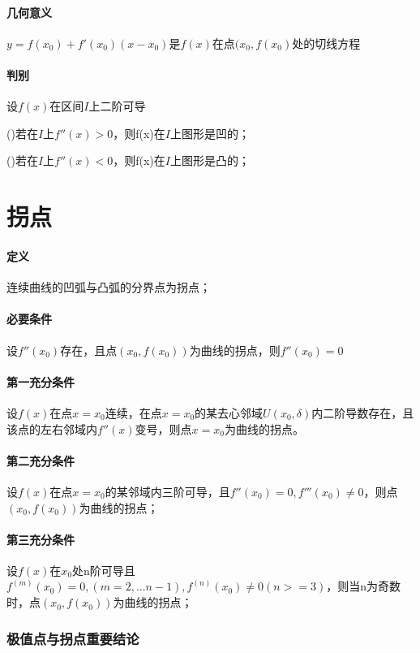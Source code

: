 \paragraph{几何意义}
\(y = f(x_0) + f'(x_0)(x - x_0)\)是\(f(x)\)在点\((x_0, f(x_0)\)处的切线方程

\paragraph{判别}
设\(f(x)\)在区间\(I\)上二阶可导

()若在\(I\)上\(f''(x) > 0\)，则f(x)在\(I\)上图形是凹的；

()若在\(I\)上\(f''(x) < 0\)，则f(x)在\(I\)上图形是凸的；


\section{拐点}
\paragraph{定义}
连续曲线的凹弧与凸弧的分界点为拐点；

\paragraph{必要条件}
设\(f''(x_0)\)存在，且点\((x_0, f(x_0))\)为曲线的拐点，则\(f''(x_0) = 0\)

\paragraph{第一充分条件}
设\(f(x)\)在点\(x = x_0\)连续，在点\(x = x_0\)的某去心邻域\(U(x_0, \delta)\)内二阶导数存在，且该点的左右邻域内\(f''(x)\)变号，则点\(x = x_0\)为曲线的拐点。

\paragraph{第二充分条件}
设\(f(x)\)在点\(x = x_0\)的某邻域内三阶可导，且\(f''(x_0) = 0, f'''(x_0) \neq 0\)，则点\((x_0, f(x_0))\)为曲线的拐点；

\paragraph{第三充分条件}
设\(f(x)\)在\(x_0\)处n阶可导且\(f^{(m)}(x_0) = 0, (m = 2, ... n - 1), f^{(n)}(x_0) \neq 0(n >= 3)\)，则当n为奇数时，点\((x_0, f(x_0))\)为曲线的拐点；

\subsubsection{极值点与拐点重要结论}

